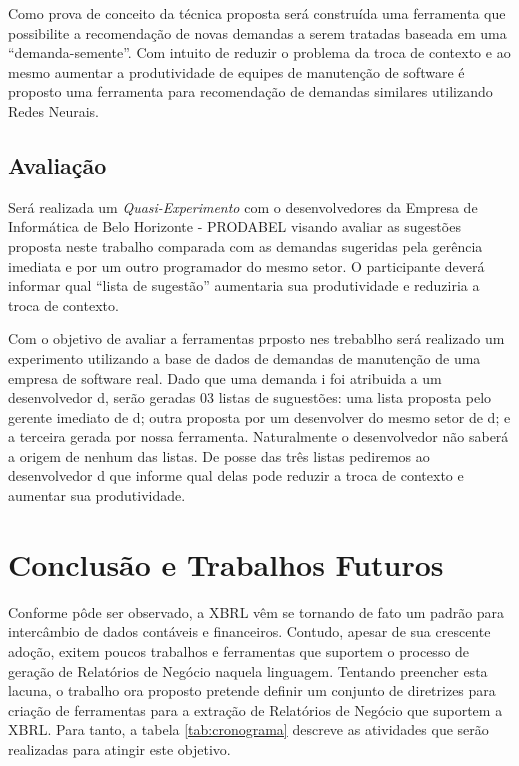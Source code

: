 \documentclass[msc,proposal,hidelot,hideabstract]{ppgccufmg} %
\begin{document}
Como prova de conceito da técnica proposta será construída uma ferramenta que
possibilite a recomendação de novas demandas a serem tratadas baseada em uma ``demanda-semente''.
Com intuito de reduzir o problema da troca de contexto e ao mesmo aumentar a
produtividade de equipes de manutenção de software é proposto uma ferramenta
para recomendação de demandas similares utilizando Redes Neurais.


\section{Avaliação}
\label{sec:avaliacao}

Será realizada um \textit{Quasi-Experimento} \cite{wohlin2012experimentation}
com o desenvolvedores da Empresa de Informática de Belo Horizonte - PRODABEL
visando avaliar as sugestões proposta neste trabalho comparada com as demandas
sugeridas pela gerência imediata e por um outro programador do mesmo setor. O
participante deverá informar qual ``lista de sugestão'' aumentaria sua
produtividade e reduziria a troca de contexto.

Com o objetivo de avaliar a ferramentas prposto nes trebablho será realizado um
experimento utilizando a base de dados de demandas de manutenção de uma empresa
de software real. Dado que uma demanda i foi atribuida a um desenvolvedor d,
serão geradas 03 listas de suguestões: uma lista proposta pelo gerente imediato
de d; outra proposta por um desenvolver do mesmo setor de d; e a terceira
gerada por nossa ferramenta. Naturalmente o desenvolvedor não saberá a origem
de nenhum das listas.  De posse das três listas pediremos ao
desenvolvedor d que informe qual delas pode reduzir a troca de contexto e
aumentar sua produtividade.

\chapter{Conclusão e Trabalhos Futuros}
\label{ch:conclusao_trab_futuros}

Conforme pôde ser observado, a XBRL vêm se tornando de fato um padrão para
intercâmbio de dados contáveis e financeiros. Contudo, apesar de sua crescente
adoção, exitem poucos trabalhos e ferramentas que suportem o processo de geração
de Relatórios de Negócio naquela linguagem.  Tentando preencher esta lacuna, o
trabalho ora proposto pretende definir um conjunto de diretrizes para criação
de ferramentas para a extração de Relatórios de Negócio que suportem a XBRL. Para tanto, a tabela \ref{tab:cronograma} descreve as atividades que serão realizadas para atingir este objetivo.
\end{document}
